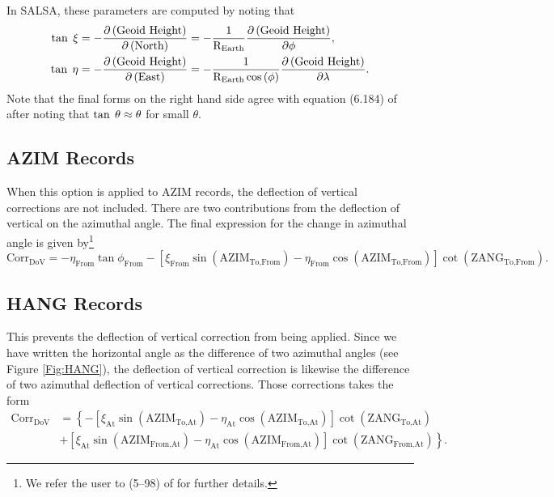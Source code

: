 In SALSA, these parameters are computed by noting that
\begin{equation}
\begin{split}
\tan\hspace{1mm}\xi&=-\frac{\partial\left(\text{Geoid Height}\right)}{\partial\left(\text{North}\right)}=-\frac{1}{\text{R}_{\text{Earth}}}\frac{\partial\left(\text{Geoid Height}\right)}{\partial\phi},\\
\tan\hspace*{1mm}\eta&=-\frac{\partial\left(\text{Geoid Height}\right)}{\partial\left(\text{East}\right)}=-\frac{1}{\text{R}_{\text{Earth}}\cos\left(\phi\right)}\frac{\partial\left(\text{Geoid Height}\right)}{\partial\lambda}.
\end{split}
\end{equation}
Note that the final forms on the right hand side agree with equation (6.184) of \cite{torge} after noting that $\tan\hspace*{1mm}\theta\approx\theta$ for small $\theta$.

\subsection{AZIM Records}
When this option is applied to AZIM records, the deflection of vertical corrections are not included.  There are two contributions from the deflection of vertical on the azimuthal angle.  The final expression for the change in azimuthal angle is given by\footnote{We refer the user to (5--98) of \cite{wellenhof} for further details.}
\begin{equation}
\text{Corr}_{\text{DoV}}=-\eta_{\text{From}}\tan\phi_{\text{From}}-\left[\xi_{\text{From}}\sin\left(\text{AZIM}_{\text{To,From}}\right)-\eta_{\text{From}}\cos\left(\text{AZIM}_{\text{To,From}}\right)\right]\cot\left(\text{ZANG}_{\text{To,From}}\right).
\end{equation}
\subsection{HANG Records}
This prevents the deflection of vertical correction from being applied.  Since we have written the horizontal angle as the difference of two azimuthal angles (see Figure \ref{Fig:HANG}), the deflection of vertical correction is likewise the difference of two azimuthal deflection of vertical corrections.  Those corrections takes the form
\begin{equation}
\begin{split}
\text{Corr}_{\text{DoV}}&=\left\{-\left[\xi_{\text{At}}\sin\left(\text{AZIM}_{\text{To,At}}\right)-\eta_{\text{At}}\cos\left(\text{AZIM}_{\text{To,At}}\right)\right]\cot\left(\text{ZANG}_{\text{To,At}}\right)\right.\\
&\left.+\left[\xi_{\text{At}}\sin\left(\text{AZIM}_{\text{From,At}}\right)-\eta_{\text{At}}\cos\left(\text{AZIM}_{\text{From,At}}\right)\right]\cot\left(\text{ZANG}_{\text{From,At}}\right)\right\}.
\end{split}
\end{equation}
